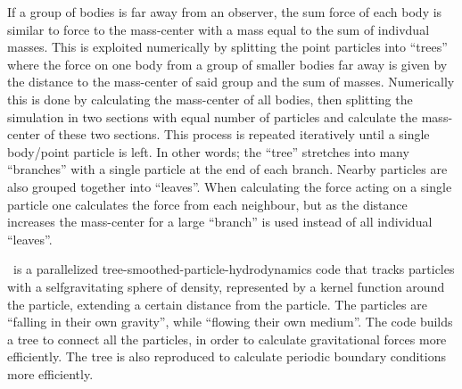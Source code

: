 \noindent
{}

If a group of bodies is far away from an observer, the sum force of each body is similar to force to the mass-center with a mass equal to the sum of indivdual masses.
This is exploited numerically by splitting the point particles into ``trees'' where the force on one body from a group of smaller bodies far away is given by the distance to the mass-center of said group and the sum of masses.
Numerically this is done by calculating the mass-center of all bodies, then splitting the simulation in two sections with equal number of particles and calculate the mass-center of these two sections. This process is repeated iteratively until a single body/point particle is left. In other words; the ``tree'' stretches into many ``branches'' with a single particle at the end of each branch. Nearby particles are also grouped together into ``leaves''.
When calculating the force acting on a single particle one calculates the force from each neighbour, but as the distance increases the mass-center for a large ``branch'' is used instead of all individual ``leaves''.

\gasoline\ is a parallelized tree-smoothed-particle-hydrodynamics code that tracks particles with a selfgravitating sphere of density, represented by a kernel function around the particle, extending a certain distance from the particle. The particles are ``falling in their own gravity'', while ``flowing their own medium''.
The code builds a tree to connect all the particles, in order to calculate gravitational forces more efficiently. The tree is also reproduced to calculate periodic boundary conditions more efficiently.


